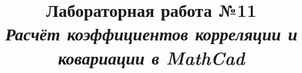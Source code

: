 \documentclass[14pt,a4paper]{article}
\title{Лабораторная работа №11 \\ \textit{Расчёт коэффициентов корреляции и ковариации в MathCad}}
\begin{document}
\maketitle


\nocite{Plis2003, Krestlev2010,MathCADshortcuts,Ochkov2016}
\printbibliography[title={Рекомендуемая литература}]
\end{document}
